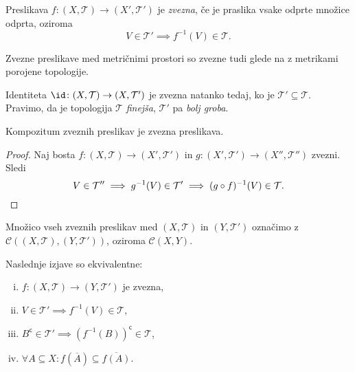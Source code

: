 
\begin{okvir}
\begin{definicija}
Preslikava $f \colon (X,\mathcal{T})\to(X',\mathcal{T}')$ je
\emph{zvezna}, če je praslika vsake odprte
množice odprta, oziroma
\[
V\in\mathcal{T}' \implies f^{-1}(V) \in \mathcal{T}.
\]
\end{definicija}
\end{okvir}

\begin{opomba}
Zvezne preslikave med metričnimi prostori so zvezne tudi glede na z
metrikami porojene topologije.
\end{opomba}

\begin{opomba}
Identiteta $\id \colon (X,\mathcal{T}) \to (X,\mathcal{T}')$ je
zvezna natanko tedaj, ko je $\mathcal{T}' \subseteq \mathcal{T}$.
Pravimo, da je topologija $\mathcal{T}$
\emph{finejša},
$\mathcal{T}'$ pa
\emph{bolj groba}.
\end{opomba}

\begin{trditev}
Kompozitum zveznih preslikav je zvezna preslikava.
\end{trditev}

\begin{proof}
Naj bosta $f \colon (X,\mathcal{T}) \to (X',\mathcal{T}')$ in
$g \colon (X',\mathcal{T}') \to (X'',\mathcal{T}'')$ zvezni. Sledi
\[
V \in \mathcal{T}'' \implies g^{-1}(V) \in \mathcal{T}' \implies
(g \circ f)^{-1}(V) \in \mathcal{T}. \qedhere
\]
\end{proof}

\begin{opomba}
Množico vseh zveznih preslikav med $(X,\mathcal{T})$ in
$(Y,\mathcal{T}')$ označimo z $\mathcal{C}((X,\mathcal{T}),
(Y,\mathcal{T}'))$, oziroma $\mathcal{C}(X,Y)$.
\end{opomba}

\begin{izrek}
Naslednje izjave so ekvivalentne:

\begin{enumerate}[i)]
\item $f \colon (X,\mathcal{T}) \to (Y,\mathcal{T}')$ je zvezna,
\item $V \in \mathcal{T}' \implies f^{-1}(V) \in \mathcal{T}$,
\item $B^\mathsf{c} \in \mathcal{T}' \implies
(f^{-1}(B))^\mathsf{c} \in \mathcal{T}$,
\item $\forall A \subseteq X \colon f(\overline{A}) \subseteq
\overline{f(A)}$.
\end{enumerate}
\end{izrek}

